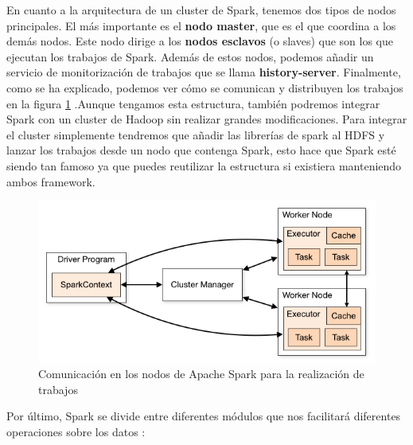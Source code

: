 En cuanto a la arquitectura de un cluster de Spark, tenemos dos tipos de nodos principales. El más importante es el \textbf{nodo master}, que es el que coordina a los demás nodos. Este nodo dirige a los \textbf{nodos esclavos} (o slaves) que son los que ejecutan los trabajos de Spark. Además de estos nodos, podemos añadir un servicio de monitorización de trabajos que se llama \textbf{history-server}. Finalmente, como se ha explicado, podemos ver cómo se comunican y distribuyen los trabajos en la figura \ref{SpkImg-1} \cite{Spk-6}.Aunque tengamos esta estructura, también podremos integrar Spark con un cluster de Hadoop sin realizar grandes modificaciones. Para integrar el cluster simplemente tendremos que añadir las librerías de spark al HDFS y lanzar los trabajos desde un nodo que contenga Spark, esto hace que Spark esté siendo tan famoso ya que puedes reutilizar la estructura si existiera manteniendo ambos framework.\par

\begin{figure}[htp]
\centering
\includegraphics[scale=0.65]{Imagenes/spark1.png}
\caption{Comunicación en los nodos de Apache Spark para la realización de trabajos}
\label{SpkImg-1}
\end{figure}

Por último, Spark se divide entre diferentes módulos que nos facilitará diferentes operaciones sobre los datos  \cite{Spk-3}:\par

